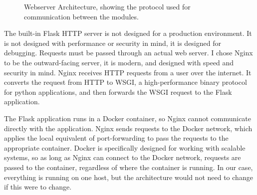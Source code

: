 \begin{figure}[htpb]
  \begin{center}
  \end{center}
  \caption{Webserver Architecture, showing the protocol used for
    communication between the modules.}
  \label{fig:webserver_architecture}
\end{figure}

The built-in Flask HTTP server is not designed for a production
environment.
It is not designed with performance or security in mind, it is designed
for debugging.
Requests must be passed through an actual web server.
I chose Nginx to be the outward-facing server, it is modern, and
designed with speed and security in mind.
Nginx receives HTTP requests from a user over the internet.
It converts the request from HTTP to WSGI, a high-performance binary
protocol for python applications, and then forwards the WSGI request to
the Flask application.

The Flask application runs in a Docker container, so Nginx cannot
communicate directly with the application. Nginx sends requests to the
Docker network, which applies the local equivalent of port-forwarding to
pass the requests to the appropriate container. Docker is specifically
designed for working with scalable systems, so as long as Nginx can
connect to the Docker network, requests are passed to the container,
regardless of where the container is running. In our case, everything is
running on one host, but the architecture would not need to change if
this were to change.

